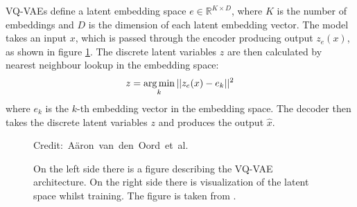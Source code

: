 VQ-VAEs define a latent embedding space $ e \in \mathbb{R}^{K \times D} $, where $K$ is the number of embeddings and $D$ is the dimension of each latent embedding vector. The model takes an input $x$, which is passed through the encoder producing output $z_e(x)$, as shown in figure \ref{VQVAEFigure}. 
The discrete latent variables $z$ are then calculated by nearest neighbour lookup in the embedding space: \[ z = \operatorname*{arg\,min}_{k} || z_e(x) - e_k ||^2 \] where $e_k$ is the $k$-th embedding vector in the embedding space. The decoder then takes the discrete latent variables $z$ and produces the output $\hat{x}$.

\begin{figure}[H]
    \centering

    \caption{On the left side there is a figure describing the VQ-VAE architecture. On the right side there is visualization of the latent space whilst training. The figure is taken from \cite{vqvae}.}
  	\medskip 
	\hspace*{15pt}\hbox{\scriptsize Credit: Aäron van den Oord et al.}
    \label{VQVAEFigure}
\end{figure}


